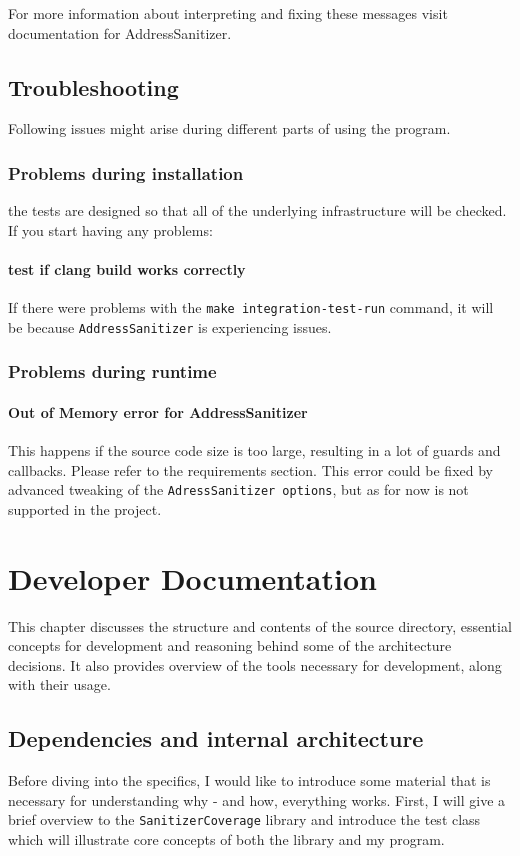 \documentclass{elteikthesis}[2018/06/06]
\newcommand*{\code}{\lstinline[keywordstyle=\color{violet}, basicstyle=\color{violet}]}
\renewcommand{\footnote}{\endnote}
\begin{document}
For more information about interpreting and fixing these messages visit documentation for AddressSanitizer\footnote{DEFINITION NOT FOUND.}. \\
\section{Troubleshooting}
\label{sec-2-5}
Following issues might arise during different parts of using the program. \\
\subsection{Problems during installation}
\label{sec-2-5-1}
the tests are designed so that all of the underlying infrastructure will be checked. If you start having any problems: \\
\subsubsection{test if clang build works correctly}
\label{sec-2-5-1-1}
If there were problems with the \code{make integration-test-run} command, it will be because \code{AddressSanitizer} is experiencing issues. \\
\subsection{Problems during runtime}
\label{sec-2-5-2}
\subsubsection{Out of Memory error for AddressSanitizer}
\label{sec-2-5-2-1}
This happens if the source code size is too large, resulting in a lot of guards and callbacks. Please refer to the requirements section. This error could be fixed by advanced tweaking of the \code{AdressSanitizer options}, but as for now is not supported in the project. \\
\chapter{Developer Documentation}
\label{sec-3}
This chapter discusses the structure and contents of the source directory, essential concepts for development and reasoning behind some of the architecture decisions. It also provides overview of the tools necessary for development, along with their usage. \\
\section{Dependencies and internal architecture}
\label{sec-3-1}
Before diving into the specifics, I would like to introduce some material that is necessary for understanding why - and how, everything works. First, I will give a brief overview to the \code{SanitizerCoverage} library and introduce the test class which will illustrate core concepts of both the library and my program. \\
\end{document}
